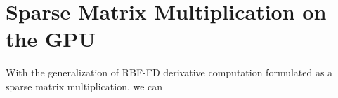 \chapter{Sparse Matrix Multiplication on the GPU} 

With the generalization of RBF-FD derivative computation formulated as a sparse matrix multiplication, we can 